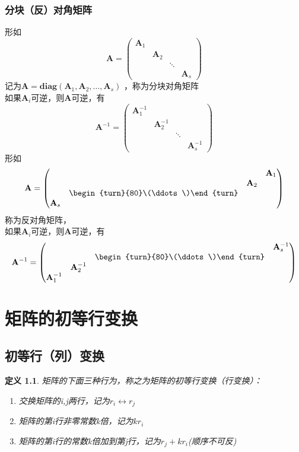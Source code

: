\documentclass[12pt,oneside]{ctexbook}
\newtheorem{definition}[subsection]{定义}
\begin{document}
\subsection{分块（反）对角矩阵}
形如\[\mathbf{A}=\begin{pmatrix}
    \mathbf{A}_1&
    \\ &\mathbf{A}_2
    \\ &&\ddots
    \\ &&&\mathbf{A}_s
\end{pmatrix}\]
记为\(\mathbf{A}= \mathbf{diag}(\mathbf{A}_{1},\mathbf{A}_{2},\dots ,\mathbf{A}_{s})\)
，称为分块对角矩阵
\\如果\(\mathbf{A}_{i}\)可逆，则\(\mathbf{A}\)可逆，有\[\mathbf{A}^{-1}=\begin{pmatrix}
    \mathbf{A}^{-1}_1&
    \\ &\mathbf{A}^{-1}_2
    \\ &&\ddots
    \\ &&&\mathbf{A}^{-1}_s
\end{pmatrix}\]
形如\[\mathbf{A}=\begin{pmatrix}
    &&&\mathbf{A}_1
    \\ &&\mathbf{A}_2
    \\ &\begin{turn}{80}\(\ddots\)\end{turn}
    \\ \mathbf{A}_s
\end{pmatrix}\]
称为反对角矩阵，
\\如果\(\mathbf{A}_{i}\)可逆，则\(\mathbf{A}\)可逆，有
\[\mathbf{A}^{-1}=\begin{pmatrix}
    &&&\mathbf{A}^{-1}_s
    \\ &&\begin{turn}{80}\(\ddots\)\end{turn}
    \\ &\mathbf{A}^{-1}_2
    \\ \mathbf{A}^{-1}_1
\end{pmatrix}\]


\chapter{矩阵的初等行变换}
\section{初等行（列）变换}
\begin{definition}
    \kaishu 矩阵的下面三种行为，称之为矩阵的初等行变换（行变换）：
\begin{enumerate}
    \item 交换矩阵的i,j两行，记为\(r_i \leftrightarrow r_j \)
    \item 矩阵的第i行非零常数k倍，记为\(kr_i\)
    \item 矩阵的第i行的常数k倍加到第j行，记为\(r_j+kr_i\)(顺序不可反)
\end{enumerate}
\end{definition}
\end{document}

